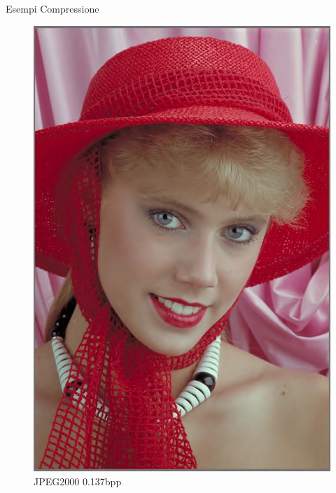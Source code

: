 \begin{frame}{Esempi Compressione}
\begin{figure}[!ht]
\begin{minipage}[]{0.13\linewidth}
                \includegraphics[width=\textwidth]{Immagini/IMAGES/JPEG2000_1_IMG0004.pdf}
                \caption{JPEG2000 0.137bpp}
                \label{fig:ExampleJPEG2000}
            \end{minipage}
            \begin{minipage}[]{0.13\linewidth}
                \centering

\end{minipage}
\end{figure}
\end{frame}
